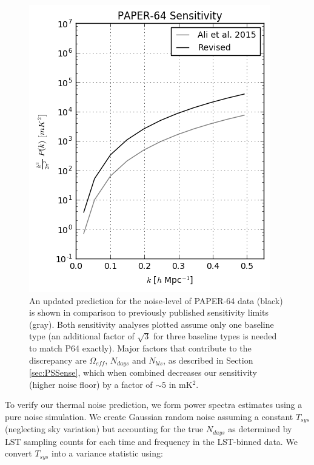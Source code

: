 \documentclass[preprint2,numberedappendix,tighten]{aastex6}  %
\begin{document}
\begin{figure}
	\centering
	\includegraphics[width=\columnwidth]{plots/sense_check.png}
	\caption{An updated prediction for the noise-level of PAPER-64 data (black) is shown in comparison to previously 
published sensitivity limits (gray). Both sensitivity analyses plotted assume only one baseline type (an additional factor of $
\sqrt{3}$ for three baseline types is needed to match P64 exactly). Major factors that contribute to the discrepancy are $
\Omega_{eff}$, $N_{days}$ and $N_{bls}$, as described in Section \ref{sec:PSSense}, which when combined decreases our 
sensitivity (higher noise floor) by a factor of $\sim5$ in mK$^{2}$.}
	\label{fig:sense_check}
\end{figure}

To verify our thermal noise prediction, we form power spectra estimates using a pure noise simulation. We create Gaussian 
random noise assuming a constant $T_{sys}$ (neglecting sky variation) but accounting for the true $N_{days}$ as determined 
by LST sampling counts for each time and frequency in the LST-binned data. We convert $T_{sys}$ into a variance statistic 
using:
\end{document}
